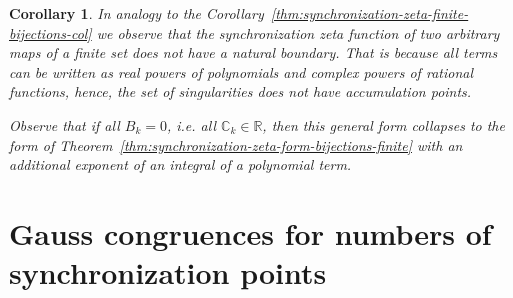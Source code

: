 \documentclass[oneside]{amsart}
\def\R{\mathbb{R}}
\def\C{\mathbb{C}}
\newtheorem{col}[thm]{Corollary}
\begin{document}
\begin{col}
  In analogy to the {\rm Corollary~\ref{thm:synchronization-zeta-finite-bijections-col}} we observe
  that the synchronization zeta function of two arbitrary maps of a finite set does not have a natural boundary.
  That is because all terms can be written as real powers of polynomials and complex powers of rational functions,
  hence, the set of singularities does not have accumulation points.

  Observe that if all $B_k = 0$, i.e. all $\C_k \in \R$, then this general form collapses
  to the form of {\rm Theorem~\ref{thm:synchronization-zeta-form-bijections-finite}}
  with an additional exponent of an integral of a polynomial term.
\end{col}







\vspace{1cm}
\section{Gauss congruences for numbers of synchronization points} \label{sec:congruences}
\end{document}
